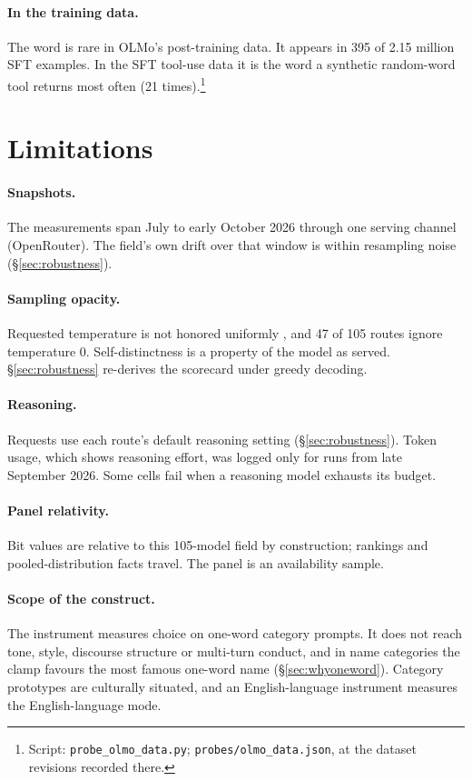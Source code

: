 \documentclass[11pt]{article}
\begin{document}
\paragraph{In the training data.}
The word is rare in OLMo's post-training data. It appears in 395 of 2.15 million SFT examples. In the SFT tool-use data it is the word a synthetic random-word tool returns most often (21 times).\footnote{Script: \texttt{probe\_olmo\_data.py}; \texttt{probes/olmo\_data.json}, at the dataset revisions recorded there.}

\section{Limitations}
\label{sec:limitations}

\paragraph{Snapshots.} The measurements span July to early October 2026 through one serving channel (OpenRouter). The field's own drift over that window is within resampling noise (\S\ref{sec:robustness}).

\paragraph{Sampling opacity.} Requested temperature is not honored uniformly \citep{song2024greedy}, and 47 of 105 routes ignore temperature 0. Self-distinctness is a property of the model as served. \S\ref{sec:robustness} re-derives the scorecard under greedy decoding.

\paragraph{Reasoning.} Requests use each route's default reasoning setting (\S\ref{sec:robustness}). Token usage, which shows reasoning effort, was logged only for runs from late September 2026. Some cells fail when a reasoning model exhausts its budget.

\paragraph{Panel relativity.} Bit values are relative to this 105-model field by construction; rankings and pooled-distribution facts travel. The panel is an availability sample.

\paragraph{Scope of the construct.} The instrument measures choice on one-word category prompts. It does not reach tone, style, discourse structure or multi-turn conduct, and in name categories the clamp favours the most famous one-word name (\S\ref{sec:whyoneword}). Category prototypes are culturally situated, and an English-language instrument measures the English-language mode.
\end{document}
